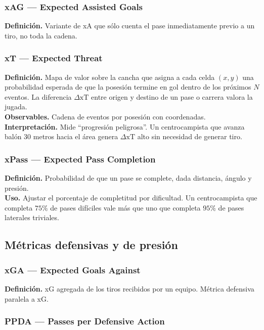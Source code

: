 \subsubsection{xAG --- Expected Assisted Goals}

\textbf{Definición.} Variante de xA que sólo cuenta el pase inmediatamente previo a un tiro, no toda la cadena.

\subsubsection{xT --- Expected Threat}

\textbf{Definición.} Mapa de valor sobre la cancha que asigna a cada celda $(x,y)$ una probabilidad esperada de que la posesión termine en gol dentro de los próximos $N$ eventos. La diferencia $\Delta \mathrm{xT}$ entre origen y destino de un pase o carrera valora la jugada.\\
\textbf{Observables.} Cadena de eventos por posesión con coordenadas.\\
\textbf{Interpretación.} Mide ``progresión peligrosa''. Un centrocampista que avanza balón 30 metros hacia el área genera $\Delta \mathrm{xT}$ alto sin necesidad de generar tiro.

\subsubsection{xPass --- Expected Pass Completion}

\textbf{Definición.} Probabilidad de que un pase se complete, dada distancia, ángulo y presión.\\
\textbf{Uso.} Ajustar el porcentaje de completitud por dificultad. Un centrocampista que completa $75\%$ de pases difíciles vale más que uno que completa $95\%$ de pases laterales triviales.

\subsection{Métricas defensivas y de presión}

\subsubsection{xGA --- Expected Goals Against}

\textbf{Definición.} xG agregada de los tiros recibidos por un equipo. Métrica defensiva paralela a xG.

\subsubsection{PPDA --- Passes per Defensive Action}

